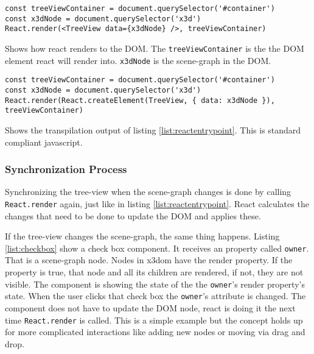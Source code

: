 \begin{listing}
  \begin{verbatim}
const treeViewContainer = document.querySelector('#container')
const x3dNode = document.querySelector('x3d')
React.render(<TreeView data={x3dNode} />, treeViewContainer)
  \end{verbatim}
  \caption{Shows how react renders to the \gls{DOM}. The \texttt{treeViewContainer} is the the \gls{DOM} element react will render into. \texttt{x3dNode} is the scene-graph in the \gls{DOM}.}
  \label{list:reactentrypoint}
\end{listing}

\begin{listing}
  \begin{verbatim}
const treeViewContainer = document.querySelector('#container')
const x3dNode = document.querySelector('x3d')
React.render(React.createElement(TreeView, { data: x3dNode }), treeViewContainer)
  \end{verbatim}
  \caption{Shows the transpilation output of listing \ref{list:reactentrypoint}. This is standard compliant javascript.}
  \label{list:reacttranspiled}
\end{listing}

\subsubsection{Synchronization Process}
\label{synchronization-process}

Synchronizing the tree-view when the scene-graph changes is done by calling
\texttt{React.render} again, just like in listing \ref{list:reactentrypoint}. React
calculates the changes that need to be done to update the \gls{DOM} and applies these.

If the tree-view changes the scene-graph, the same thing happens. Listing
\ref{list:checkbox} show a check box component. It receives an property called
\texttt{owner}. That is a scene-graph node. Nodes in x3dom have the render
property. If the property is true, that node and all its children are rendered,
if not, they are not visible. The component is showing the state of the the
\texttt{owner}'s render property's state. When the user clicks that check box the
\texttt{owner}'s attribute is changed. The component does not have to update the
\gls{DOM} node, react is doing it the next time \texttt{React.render} is called. This
is a simple example but the concept holds up for more complicated interactions
like adding new nodes or moving via drag and drop.

